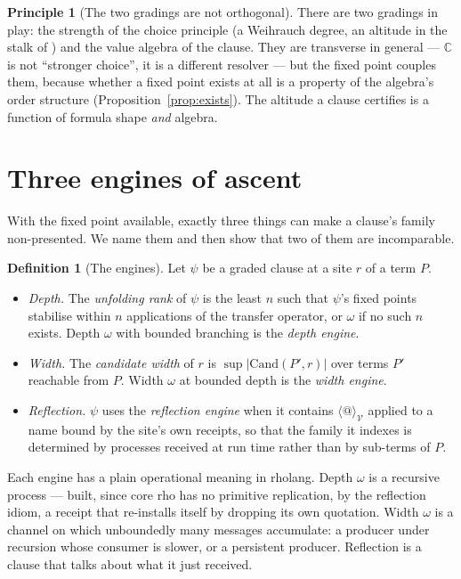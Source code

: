 \documentclass[11pt]{article}
\theoremstyle{definition}
\newtheorem{definition}{Definition}
\newtheorem{principle}{Principle}
\theoremstyle{plain}
\theoremstyle{remark}
\newcommand{\V}{\mathcal{V}}
\newcommand{\Cx}{\mathbb{C}}
\newcommand{\Cand}{\mathrm{Cand}}
\begin{document}
\begin{principle}[The two gradings are not orthogonal]\label{prin:complementary}
There are two gradings in play: the strength of the choice principle (a Weihrauch
degree, an altitude in the stalk of \cite{agency}) and the value algebra of the clause.
They are transverse in general --- $\Cx$ is not ``stronger choice'', it is a different
resolver --- but the fixed point couples them, because whether a fixed point exists at
all is a property of the algebra's order structure
(Proposition~\ref{prop:exists}). The altitude a clause certifies is a function of
formula shape \emph{and} algebra.
\end{principle}

\section{Three engines of ascent}\label{sec:engines}

With the fixed point available, exactly three things can make a clause's family
non-presented. We name them and then show that two of them are incomparable.

\begin{definition}[The engines]\label{def:engines}
Let $\psi$ be a graded clause at a site $r$ of a term $P$.
\begin{itemize}[leftmargin=1.4em,itemsep=3pt]
\item \emph{Depth.} The \emph{unfolding rank} of $\psi$ is the least $n$ such that
$\psi$'s fixed points stabilise within $n$ applications of the transfer operator,
or $\omega$ if no such $n$ exists. Depth $\omega$ with bounded branching is the
\emph{depth engine}.
\item \emph{Width.} The \emph{candidate width} of $r$ is $\sup |\Cand(P',r)|$ over
terms $P'$ reachable from $P$. Width $\omega$ at bounded depth is the \emph{width
engine}.
\item \emph{Reflection.} $\psi$ uses the \emph{reflection engine} when it contains
$\langle @ \rangle_\V$ applied to a name bound by the site's own receipts, so that the
family it indexes is determined by processes received at run time rather than by
sub-terms of $P$.
\end{itemize}
\end{definition}

Each engine has a plain operational meaning in rholang. Depth $\omega$ is a recursive
process --- built, since core rho has no primitive replication, by the reflection
idiom, a receipt that re-installs itself by dropping its own quotation. Width $\omega$
is a channel on which unboundedly many messages accumulate: a producer under recursion
whose consumer is slower, or a persistent producer. Reflection is a clause that talks
about what it just received.
\end{document}
